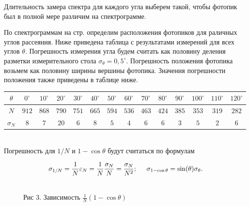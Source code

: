 \documentclass[12pt]{article}
\begin{document}
    Длительность замера спектра для каждого угла выберем такой, чтобы фотопик
    был в полной мере различим на спектрограмме.

    По спектрограммам на стр. \pageref{add:spectres} определим расположения
    фотопиков для раличных углов рассеяния.
    Ниже приведена таблица с результатами измерений для всех углов $\theta$.
    Погрешность измерения угла будем считать как половину деления разметки
    измерительного стола $\sigma_{\theta} = 0,5^{\circ}$.
    Погрешность положения фотопика возьмем как половину ширины вершины фотопика.
    Значения погрешности положения также приведены в таблице ниже.\\

    \begin{tabular}{|c||c|c|c|c|c|c|c|c|c|c|c|c|c|}
      \hline
      $\theta$ & $0^{\circ}$ & $10^{\circ}$ & $20^{\circ}$ & $30^{\circ}$ &
      $40^{\circ}$ & $50^{\circ}$ & $60^{\circ}$ & $70^{\circ}$ & $80^{\circ}$ &
      $90^{\circ}$ & $100^{\circ}$ & $110^{\circ}$ & $120^{\circ}$ \\ \hline
      $N$ & $912$ & $868$ & $790$ & $751$ & $665$ & $594$ & $536$ & $463$ &
      $424$ & $385$ & $353$ & $319$ & $282$ \\ \hline
      $\sigma_N$ & $8$ & $7$ & $20$ & $6$ & $8$ & $5$ & $4$ & $6$ & $6$ & $3$ &
      $5$ & $2$ & $6$ \\
      \hline
    \end{tabular}\\

    Погрешность для $1/N$ и $1 - \cos\theta$ будут считаться по формулам

    $$
      \sigma_{1/N} = \frac{1}{N} \varepsilon_N = \frac{1}{N} \frac{\sigma_N}{N}
      = \frac{\sigma_N}{N^2}; \hspace{0.5cm}
      \sigma_{1 - \cos\theta} = \sin(\theta) \sigma_{\theta}.
    $$

    \begin{figure}[h!]
      \\
      Рис 3. Зависимость $\frac{1}{N} \left(1 - \cos \theta \right)$
      \label{fig:plot}
    \end{figure}
\end{document}
